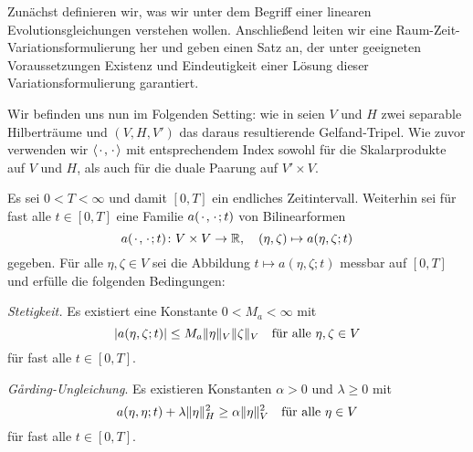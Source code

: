 Zunächst definieren wir, was wir unter dem Begriff einer linearen Evolutionsgleichungen verstehen wollen.
Anschließend leiten wir eine Raum-Zeit-Variationsformulierung her und geben einen Satz an, der unter geeigneten Voraussetzungen Existenz und Eindeutigkeit einer Lösung dieser Variationsformulierung garantiert.

Wir befinden uns nun im Folgenden Setting:
wie in  seien $V$ und $H$ zwei separable Hilberträume und $(V, H, V')$ das daraus resultierende Gelfand-Tripel.
Wie zuvor verwenden wir $\left\langle{\mkern2mu\cdot\mkern2mu},{\mkern2mu\cdot\mkern2mu}\right\rangle$ mit entsprechendem Index sowohl für die Skalarprodukte auf $V$ und $H$, als auch für die duale Paarung auf $V' \times V$.

Es sei $0 < T < \infty$ und damit $[0, T]$ ein endliches Zeitintervall.
Weiterhin sei für fast alle $t \in [0, T]$ eine Familie $a({\mkern2mu\cdot\mkern2mu}, {\mkern2mu\cdot\mkern2mu}; t)$ von Bilinearformen
\begin{equation}
    \label{eq:gl:familie_bf_a}
    a(\blank, \blank; t) \colon V \times V \to \mathbb{R}, \quad (\eta, \zeta) \mapsto a(\eta, \zeta; t)
\end{equation}
gegeben.
Für alle $\eta, \zeta \in V$ sei die Abbildung $t \mapsto a(\eta, \zeta; t)$ messbar auf $[0, T]$ und erfülle die folgenden Bedingungen:

\begin{Annahme}
\label{annahme:eigenschaften_bf_a}
    \leavevmode
    \begin{thmenumerate}
        \item \emph{Stetigkeit.}
        Es existiert eine Konstante $0 < M_{a} < \infty$ mit
        \begin{equation}
            \label{eq:allgemeine_parabolische_pde:bf_stetig}
            \abs{a(\eta, \zeta; t)} \leq M_{a} \norm{\eta}_{V} \norm{\zeta}_{V} \quad \fa \eta, \zeta \in V
        \end{equation}
        für fast alle $t \in [0, T]$.
        \item \emph{G\r{a}rding-Ungleichung}.
        Es existieren Konstanten $\alpha > 0$ und $\lambda \geq 0$ mit
        \begin{equation}
            \label{eq:allgemeine_parabolische_pde:bf_garding}
            a(\eta, \eta; t) + \lambda \norm{\eta}_{H}^{2} \geq \alpha \norm{\eta}_{V}^{2} \quad \fa \eta \in V
        \end{equation}
        für fast alle $t \in [0, T]$.
    \end{thmenumerate}
\end{Annahme}

